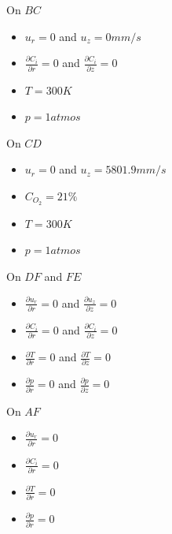 \bigskip 
 On $BC$
\begin{itemize}
\item $u_r = 0$ and $u_z=0 mm/s$
\item $\frac{\partial C_i}{\partial r} =0 $ and $\frac{\partial C_i}{\partial z} =0 $
\item $T = 300K$
\item $p=1 atmos$
\end{itemize}

 On $CD$
\begin{itemize}
\item $u_r = 0$ and $u_z=5801.9 mm/s$
\item $ C_{O_2} =21 \% $
\item $T = 300K$
\item $p=1 atmos$
\end{itemize}

 On $DF$ and $FE$
\begin{itemize}
\item $\frac{\partial u_r}{\partial r} =0 $ and $\frac{\partial u_z}{\partial z} =0 $
\item $\frac{\partial C_i}{\partial r} =0 $ and $\frac{\partial C_i}{\partial z} =0 $
\item $\frac{\partial T}{\partial r} =0 $ and $\frac{\partial T}{\partial z} =0 $
\item $\frac{\partial p}{\partial r} =0 $ and $\frac{\partial p}{\partial z} =0 $
\end{itemize}


 On $AF$
\begin{itemize}
\item $\frac{\partial u_r}{\partial r} =0 $ 
\item $\frac{\partial C_i}{\partial r} =0 $ 
\item $\frac{\partial T}{\partial r} =0 $  
\item $\frac{\partial p}{\partial r} =0 $
\end{itemize}


